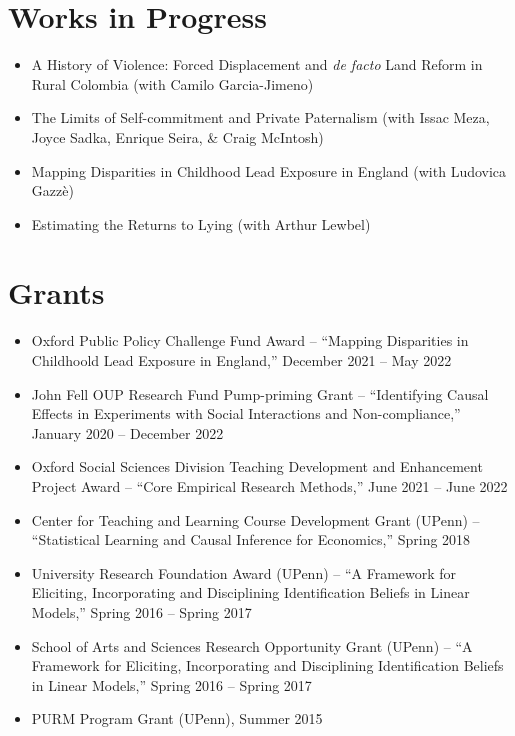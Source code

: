 \documentclass[line,overlapped]{myres}
\begin{document}
\begin{resume}
\section{\sc Works in Progress}
\begin{itemize}
  \item A History of Violence: Forced Displacement and \emph{de facto} Land Reform in Rural Colombia (with Camilo Garcia-Jimeno)
  \item The Limits of Self-commitment and Private Paternalism (with Issac Meza, Joyce Sadka, Enrique Seira, \& Craig McIntosh)
  \item Mapping Disparities in Childhood Lead Exposure in England (with Ludovica Gazz\`e) 
  \item Estimating the Returns to Lying (with Arthur Lewbel)
\end{itemize}

\section{\sc Grants}
\begin{itemize}
  \item Oxford Public Policy Challenge Fund Award -- ``Mapping Disparities in Childhoold Lead Exposure in England,'' December 2021 -- May 2022 %
  \item John Fell OUP Research Fund Pump-priming Grant -- ``Identifying Causal Effects in Experiments with Social Interactions and Non-compliance,'' January 2020 -- December 2022 %
  \item Oxford Social Sciences Division Teaching Development and Enhancement Project Award -- ``Core Empirical Research Methods,'' June 2021 -- June 2022 %
  \item Center for Teaching and Learning Course Development Grant (UPenn) -- ``Statistical Learning and Causal Inference for Economics,'' Spring 2018 %
  \item University Research Foundation Award (UPenn) -- ``A Framework for Eliciting, Incorporating and Disciplining Identification Beliefs in Linear Models,'' Spring 2016 -- Spring 2017 %
  \item School of Arts and Sciences Research Opportunity Grant (UPenn) -- ``A Framework for Eliciting, Incorporating and Disciplining Identification Beliefs in Linear Models,'' Spring 2016 -- Spring 2017  %
  \item PURM Program Grant (UPenn), Summer 2015 %
\end{itemize}



\end{resume}
\end{document}
